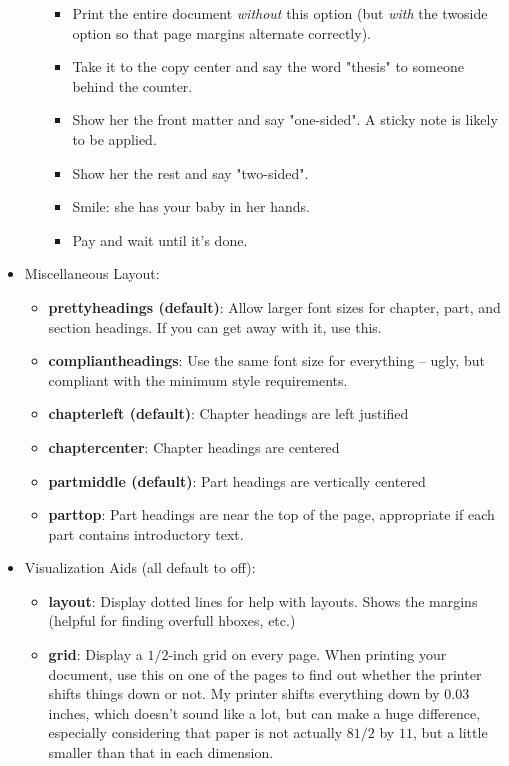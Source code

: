 \documentclass[letterpaper,phd,prettyheadings,chaptercenter,parttop]{byumsphd}
\begin{document}
\begin{itemize}
\begin{itemize}
              \begin{itemize}
                \item Print the entire document \emph{without} this option (but \emph{with} the twoside option so that page margins alternate correctly).
                \item Take it to the copy center and say the word "thesis" to someone behind the counter.
                \item Show her the front matter and say "one-sided".  A sticky note is likely to be applied.
                \item Show her the rest and say "two-sided".
                \item Smile: she has your baby in her hands.
                \item Pay and wait until it's done.
              \end{itemize}
        \end{itemize}
    \item Miscellaneous Layout:
        \begin{itemize}
            \item \textbf{prettyheadings (default)}: Allow larger font sizes for chapter, part, and section headings.  If you can get away with it, use this.
            \item \textbf{compliantheadings}: Use the same font size for everything -- ugly, but compliant with the minimum style requirements.
            \item \textbf{chapterleft (default)}: Chapter headings are left justified
            \item \textbf{chaptercenter}: Chapter headings are centered
            \item \textbf{partmiddle (default)}: Part headings are vertically centered
            \item \textbf{parttop}: Part headings are near the top of the page, appropriate if each part contains introductory text.
        \end{itemize}
\pagebreak
    \item Visualization Aids (all default to off):
        \begin{itemize}
            \item \textbf{layout}: Display dotted lines for help with layouts.  Shows the margins (helpful for finding overfull hboxes, etc.)
            \item \textbf{grid}: Display a \( 1/2 \)-inch grid on every page.  When printing your document, use this on one of the pages to find out whether the printer shifts things down or not.  My printer shifts everything down by \( 0.03 \) inches, which doesn't sound like a lot, but can make a huge difference, especially considering that paper is not actually \( 8 1/2 \) by \( 11 \), but a little smaller than that in each dimension.

\end{itemize}
\end{itemize}
\end{document}
